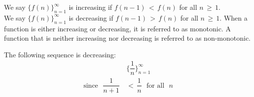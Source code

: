 \begin{definition}
We say $\{f(n)\}_{n=1}^{\infty}$ is increasing if $f(n-1) \hspace{2pt} < \hspace{2pt} f(n)$ for all $n \hspace{2pt} \geq \hspace{2pt} 1$.\\[1ex]
We say $\{f(n)\}_{n=1}^{\infty}$ is decreasing if $f(n-1) \hspace{2pt} > \hspace{2pt} f(n)$ for all $n \hspace{2pt} \geq \hspace{2pt} 1$. When a function is either increasing or decreasing, it is referred to as monotonic. A function that is neither increasing nor decreasing is referred to as non-monotonic.
\end{definition}

\begin{example}
The following sequence is decreasing:
\begin{align*}
    &\Big\{\dfrac{1}{n}\Big\}_{n=1}^{\infty}\\[2ex]
    \text{since } \hspace{4pt} \dfrac{1}{n+1} \hspace{2pt} &< \hspace{2pt} \dfrac{1}{n} \hspace{4pt} \text{ for all } \hspace{4pt} n
\end{align*}
\end{example}

